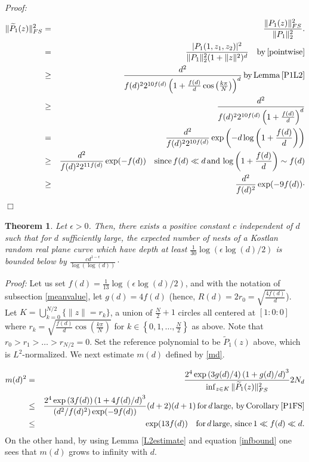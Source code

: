 \documentclass [11pt]{amsart}
\newtheorem {theorem}{Theorem}
\theoremstyle{remark}
\numberwithin{equation}{section}
\numberwithin{theorem}{section}
\begin{document}
\noindent\textit{Proof:} 
\begin{eqnarray*} 
\|\widetilde{P}_{1}(z)\|_{FS}^2 &=& \frac{\|P_{1}(z)\|^2_{FS}}{\|P_{1}\|^2_{2}}.   \\
&=& \frac{ |P_{1}(1,z_{1},z_{2})|^2}{\|P_{1}\|_{2}^2 (1+\|z\|^2)^d} \quad \mathrm{by} \, \eqref{pointwise} \\
&\geq& \frac{d^2}{f(d)^2 2^{10f(d)} \left(1+ \frac{f(d)}{d} \cos\left(\frac{k\pi}{N}\right) \right)^d} \, \mathrm{by}\, \mathrm{Lemma} \, \ref{P1L2} \\ 
&\geq& \frac{d^2}{f(d)^2 2^{10f(d)} \left(1+ \frac{f(d)}{d}\right)^d}  \\
&=& \frac{d^2}{f(d)^2 2^{10f(d)}} \exp\left(-d\log\left(1+\frac{f(d)}{d}\right)\right) \\
&\geq& \frac{d^2}{f(d)^2 2^{11f(d)}}\exp(-f(d)) \quad \mathrm{since} \, f(d)\ll d \,\mathrm{and}\, \log\left(1+\frac{f(d)}{d}\right) \sim f(d) \\
&\geq& \frac{d^2}{f(d)^2}\exp(-9f(d))\cdot
\end{eqnarray*}
\hfill $\Box$ 

\begin{theorem} \label{expecteddepth}
Let $\epsilon>0$. Then, there exists a positive constant $c$ independent of $d$ such that for $d$ sufficiently large,  the expected number of nests of a Kostlan random real plane curve which have depth at least $\displaystyle{\frac{1}{30}\log(\epsilon \log(d)/2)}$ is bounded below by $\displaystyle{\frac{cd^{1-\epsilon}}{\log(\log(d))}\cdot}$
\end{theorem} 

\noindent \textit{Proof:}  Let us set $\displaystyle{f(d)=\frac{1}{13}\log(\epsilon \log(d)/2)}$, and with the notation of subsection \ref{meanvalue}, let $g(d)= 4f(d)$ (hence, $\displaystyle{R(d)=2r_{0}=\sqrt{\frac{4f(d)}{d}}}$). Let $\displaystyle{K= \bigcup_{k=0}^{N/2} \{\|z\|=r_{k} \}}$, a union of $\displaystyle{\frac{N}{2}+1}$ circles all centered at $[1:0:0]$ where $\displaystyle{r_{k}= \sqrt{\frac{f(d)}{d} \cos\left(\frac{k\pi}{N}\right)}}$ for  $\displaystyle{ k\in \left\{0,1,\ldots, \frac{N}{2}\right\}}$ as above. Note that $r_{0}>r_{1}>\ldots>r_{N/2}=0$. Set the reference polynomial to be $\widetilde{P}_{1}(z)$ above, which is $L^2$-normalized. We next estimate $m(d)$ defined by \eqref{md}. 

\begin{eqnarray*} 
m(d)^2&=&  \frac{2^4  \exp\left(3g(d)/4\right) \left(1+g(d)/d\right)^3 }{\inf_{z\in K}  \|\widetilde{P}_{1}(z)\|^2_{FS} }2N_{d}    \\
&\leq&  \frac{2^4  \exp\left(3f(d)\right) \left(1+4f(d)/d\right)^3 }{ (d^2/f(d)^2)\exp(-9f(d)) }(d+2)(d+1) \, \mathrm{for} \, d \, \mathrm{large},\, \mathrm{by} \, \mathrm{Corollary} \, \ref{P1FS}       \\
&\leq& \exp(13f(d)) \quad \mathrm{for} \, d \, \mathrm{large},\, \mathrm{since} \, 1\ll f(d)\ll d. 
\end{eqnarray*}
\noindent On the other hand, by using Lemma \ref{L2estimate} and equation \eqref{infbound} one sees that $m(d)$ grows to infinity with $d$. 
\end{document}
